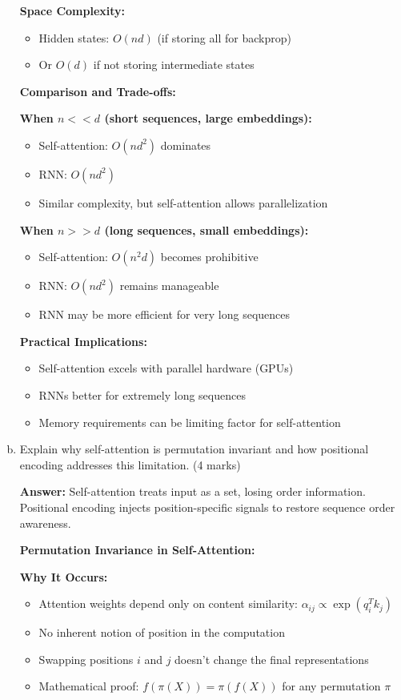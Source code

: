 \documentclass[12pt]{article}
\newcommand{\answer}[1]{{\color{answercolor}\textbf{Answer:} #1}}
\newcommand{\explanation}[1]{{\color{explanationcolor}#1}}
\begin{document}
\begin{center}
\begin{enumerate}[(a)]
{    \textbf{Space Complexity:}
    \begin{itemize}
        \item Hidden states: $O(nd)$ (if storing all for backprop)
        \item Or $O(d)$ if not storing intermediate states
    \end{itemize}
    
    \textbf{Comparison and Trade-offs:}
    
    \textbf{When $n << d$ (short sequences, large embeddings):}
    \begin{itemize}
        \item Self-attention: $O(nd^2)$ dominates
        \item RNN: $O(nd^2)$
        \item Similar complexity, but self-attention allows parallelization
    \end{itemize}
    
    \textbf{When $n >> d$ (long sequences, small embeddings):}
    \begin{itemize}
        \item Self-attention: $O(n^2d)$ becomes prohibitive
        \item RNN: $O(nd^2)$ remains manageable
        \item RNN may be more efficient for very long sequences
    \end{itemize}
    
    \textbf{Practical Implications:}
    \begin{itemize}
        \item Self-attention excels with parallel hardware (GPUs)
        \item RNNs better for extremely long sequences
        \item Memory requirements can be limiting factor for self-attention
    \end{itemize}
    }
    
    \item Explain why self-attention is permutation invariant and how positional encoding addresses this limitation. \hfill (4 marks)
    
    \answer{Self-attention treats input as a set, losing order information. Positional encoding injects position-specific signals to restore sequence order awareness.}
    
    \explanation{
    \textbf{Permutation Invariance in Self-Attention:}
    
    \textbf{Why It Occurs:}
    \begin{itemize}
        \item Attention weights depend only on content similarity: $\alpha_{ij} \propto \exp(q_i^T k_j)$
        \item No inherent notion of position in the computation
        \item Swapping positions $i$ and $j$ doesn't change the final representations
        \item Mathematical proof: $f(\pi(X)) = \pi(f(X))$ for any permutation $\pi$
    \end{itemize}
    
}
\end{enumerate}
\end{center}
\end{document}
